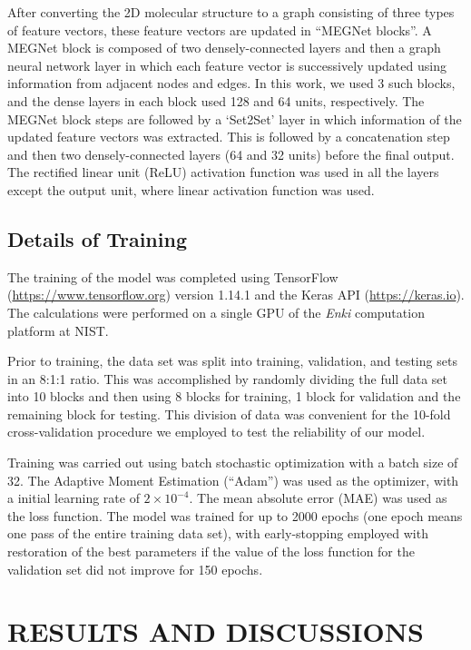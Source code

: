 \documentclass{IEEEcsmag}
\begin{document}
After converting the 2D molecular structure to a graph consisting of three types of feature vectors, these feature vectors are updated in ``MEGNet blocks''. A MEGNet block is composed of two densely-connected layers and then a graph neural network layer in which each feature vector is successively updated using information from adjacent nodes and edges. In this work, we used 3 such blocks, and the dense layers in each block used 128 and 64 units, respectively. The MEGNet block steps are followed by a `Set2Set' layer in which information of the updated feature vectors was extracted. This is followed by a concatenation step and then two densely-connected layers (64 and 32 units) before the final output. The rectified linear unit (ReLU) activation function was used in all the layers except the output unit, where linear activation function was used.

\subsection{Details of Training}

The training of the model was completed using TensorFlow (\href{https://www.tensorflow.org}{https://www.tensorflow.org}) version 1.14.1 and the Keras API (\href{https://keras.io}{https://keras.io}). The calculations were performed on a single GPU of the \textit{Enki} computation platform at NIST.

Prior to training, the data set was split into training, validation, and testing sets in an 8:1:1 ratio. This was accomplished by randomly dividing the full data set into 10 blocks and then using 8 blocks for training, 1 block for validation and the remaining block for testing. This division of data was convenient for the 10-fold cross-validation procedure we employed to test the reliability of our model.

Training was carried out using batch stochastic optimization with a batch size of 32. The Adaptive Moment Estimation (``Adam'') was used as the optimizer, with a initial learning rate of $2\times 10^{-4}$. The mean absolute error (MAE) was used as the loss function. The model was trained for up to 2000 epochs (one epoch means one pass of the entire training data set), with early-stopping employed with restoration of the best parameters if the value of the loss function for the validation set did not improve for 150 epochs.

\section{RESULTS AND DISCUSSIONS}
\end{document}
